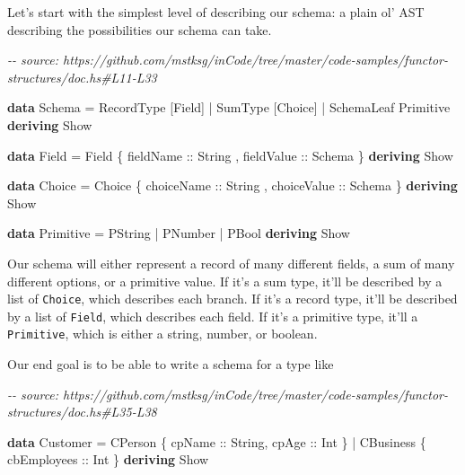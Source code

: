 \documentclass[]{article}
\newenvironment{Shaded}{}{}
\newcommand{\CommentTok}[1]{\textcolor[rgb]{0.38,0.63,0.69}{\textit{#1}}}
\newcommand{\DataTypeTok}[1]{\textcolor[rgb]{0.56,0.13,0.00}{#1}}
\newcommand{\KeywordTok}[1]{\textcolor[rgb]{0.00,0.44,0.13}{\textbf{#1}}}
\newcommand{\NormalTok}[1]{#1}
\newcommand{\OperatorTok}[1]{\textcolor[rgb]{0.40,0.40,0.40}{#1}}
\newcommand{\OtherTok}[1]{\textcolor[rgb]{0.00,0.44,0.13}{#1}}
\begin{document}
Let's start with the simplest level of describing our schema: a plain ol' AST
describing the possibilities our schema can take.

\begin{Shaded}
\begin{Highlighting}[]
\CommentTok{{-}{-} source: https://github.com/mstksg/inCode/tree/master/code{-}samples/functor{-}structures/doc.hs\#L11{-}L33}

\KeywordTok{data} \DataTypeTok{Schema} \OtherTok{=}
      \DataTypeTok{RecordType}\NormalTok{  [}\DataTypeTok{Field}\NormalTok{]}
    \OperatorTok{|} \DataTypeTok{SumType}\NormalTok{     [}\DataTypeTok{Choice}\NormalTok{]}
    \OperatorTok{|} \DataTypeTok{SchemaLeaf}  \DataTypeTok{Primitive}
  \KeywordTok{deriving} \DataTypeTok{Show}

\KeywordTok{data} \DataTypeTok{Field} \OtherTok{=} \DataTypeTok{Field}
\NormalTok{    \{}\OtherTok{ fieldName  ::} \DataTypeTok{String}
\NormalTok{    ,}\OtherTok{ fieldValue ::} \DataTypeTok{Schema}
\NormalTok{    \}}
  \KeywordTok{deriving} \DataTypeTok{Show}

\KeywordTok{data} \DataTypeTok{Choice} \OtherTok{=} \DataTypeTok{Choice}
\NormalTok{    \{}\OtherTok{ choiceName  ::} \DataTypeTok{String}
\NormalTok{    ,}\OtherTok{ choiceValue ::} \DataTypeTok{Schema}
\NormalTok{    \}}
  \KeywordTok{deriving} \DataTypeTok{Show}

\KeywordTok{data} \DataTypeTok{Primitive} \OtherTok{=}
      \DataTypeTok{PString}
    \OperatorTok{|} \DataTypeTok{PNumber}
    \OperatorTok{|} \DataTypeTok{PBool}
  \KeywordTok{deriving} \DataTypeTok{Show}
\end{Highlighting}
\end{Shaded}

Our schema will either represent a record of many different fields, a sum of
many different options, or a primitive value. If it's a sum type, it'll be
described by a list of \texttt{Choice}, which describes each branch. If it's a
record type, it'll be described by a list of \texttt{Field}, which describes
each field. If it's a primitive type, it'll a \texttt{Primitive}, which is
either a string, number, or boolean.

Our end goal is to be able to write a schema for a type like

\begin{Shaded}
\begin{Highlighting}[]
\CommentTok{{-}{-} source: https://github.com/mstksg/inCode/tree/master/code{-}samples/functor{-}structures/doc.hs\#L35{-}L38}

\KeywordTok{data} \DataTypeTok{Customer} \OtherTok{=}
      \DataTypeTok{CPerson}\NormalTok{   \{}\OtherTok{ cpName ::} \DataTypeTok{String}\NormalTok{,}\OtherTok{ cpAge ::} \DataTypeTok{Int}\NormalTok{ \}}
    \OperatorTok{|} \DataTypeTok{CBusiness}\NormalTok{ \{}\OtherTok{ cbEmployees ::} \DataTypeTok{Int}\NormalTok{ \}}
  \KeywordTok{deriving} \DataTypeTok{Show}
\end{Highlighting}
\end{Shaded}
\end{document}
